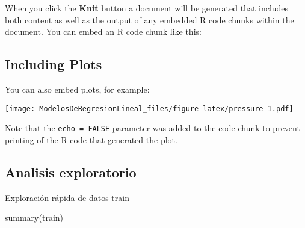 \documentclass[
]{article}
\newenvironment{Shaded}{\begin{snugshade}}{\end{snugshade}}
\newcommand{\FunctionTok}[1]{\textcolor[rgb]{0.00,0.00,0.00}{#1}}
\newcommand{\NormalTok}[1]{#1}
\begin{document}
When you click the \textbf{Knit} button a document will be generated
that includes both content as well as the output of any embedded R code
chunks within the document. You can embed an R code chunk like this:

\hypertarget{including-plots}{%
\subsection{Including Plots}\label{including-plots}}

You can also embed plots, for example:

\texttt{[image: ModelosDeRegresionLineal\_files/figure-latex/pressure-1.pdf]}

Note that the \texttt{echo\ =\ FALSE} parameter was added to the code
chunk to prevent printing of the R code that generated the plot.

\hypertarget{analisis-exploratorio}{%
\subsection{Analisis exploratorio}\label{analisis-exploratorio}}

Exploración rápida de datos train

\begin{Shaded}
\begin{Highlighting}[]
\FunctionTok{summary}\NormalTok{(train)}
\end{Highlighting}
\end{Shaded}
\end{document}
